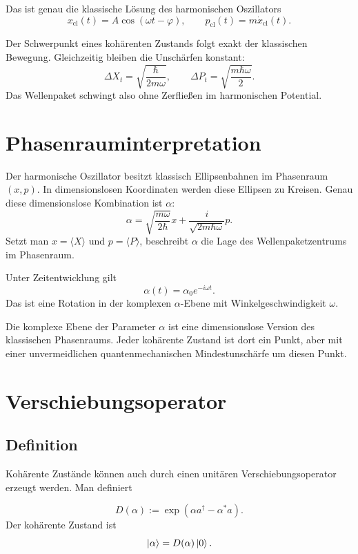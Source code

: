 Das ist genau die klassische Lösung des harmonischen Oszillators
\[
    x_{\text{cl}}(t)=A\cos(\omega t-\varphi),
    \qquad
    p_{\text{cl}}(t)=m\dot x_{\text{cl}}(t).
\]

\begin{conceptbox}
Der Schwerpunkt eines kohärenten Zustands folgt exakt der klassischen Bewegung. Gleichzeitig bleiben die Unschärfen konstant:
\[
    \Delta X_t=\sqrt{\frac{\hbar}{2m\omega}},
    \qquad
    \Delta P_t=\sqrt{\frac{m\hbar\omega}{2}}.
\]
Das Wellenpaket schwingt also ohne Zerfließen im harmonischen Potential.
\end{conceptbox}

\section{Phasenrauminterpretation}

Der harmonische Oszillator besitzt klassisch Ellipsenbahnen im Phasenraum \((x,p)\). In dimensionslosen Koordinaten werden diese Ellipsen zu Kreisen. Genau diese dimensionslose Kombination ist \(\alpha\):
\[
    \alpha=\sqrt{\frac{m\omega}{2\hbar}}x+\frac{i}{\sqrt{2m\hbar\omega}}p.
\]
Setzt man \(x=\langle X\rangle\) und \(p=\langle P\rangle\), beschreibt \(\alpha\) die Lage des Wellenpaketzentrums im Phasenraum.

Unter Zeitentwicklung gilt
\[
    \alpha(t)=\alpha_0e^{-i\omega t}.
\]
Das ist eine Rotation in der komplexen \(\alpha\)-Ebene mit Winkelgeschwindigkeit \(\omega\).

\begin{notebox}
Die komplexe Ebene der Parameter \(\alpha\) ist eine dimensionslose Version des klassischen Phasenraums. Jeder kohärente Zustand ist dort ein Punkt, aber mit einer unvermeidlichen quantenmechanischen Mindestunschärfe um diesen Punkt.
\end{notebox}

\section{Verschiebungsoperator}

\subsection{Definition}

Kohärente Zustände können auch durch einen unitären Verschiebungsoperator erzeugt werden. Man definiert
\begin{definitionbox}
\[
    D(\alpha):=\exp(\alpha a^\dagger-\alpha^*a).
\]
Der kohärente Zustand ist
\[
    \left|\alpha\right\rangle=D(\alpha)\left|0\right\rangle.
\]
\end{definitionbox}

